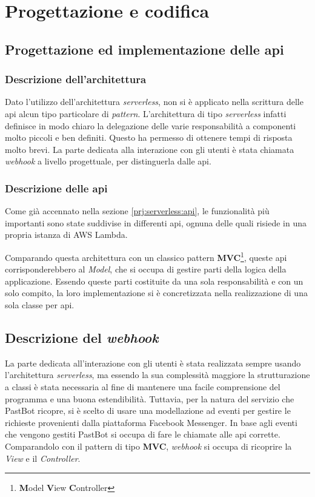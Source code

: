 
\chapter{Progettazione e codifica}

\section{Progettazione ed implementazione delle \gls{api}}

\subsection{Descrizione dell'architettura}

Dato l'utilizzo dell'architettura \textit{serverless}, non si è applicato nella
scrittura delle \gls{api} alcun tipo particolare di \textit{pattern}.
L'architettura di tipo \textit{serverless} infatti definisce in modo chiaro la
delegazione delle varie responsabilità a componenti molto piccoli e ben
definiti. Questo ha permesso di ottenere tempi di risposta molto brevi.
La parte dedicata alla interazione con gli utenti è stata chiamata
\textit{webhook} a livello progettuale, per distinguerla dalle \gls{api}.

\subsection{Descrizione delle \gls{api}}
Come già accennato nella sezione \ref{prj:serverless:api}, le funzionalità più
importanti sono state suddivise in differenti \gls{api}, ognuna delle quali
risiede in una propria istanza di AWS Lambda.

Comparando questa architettura con un classico pattern
\textbf{MVC}\footnote{\textbf{M}odel \textbf{V}iew \textbf{C}ontroller}, queste
\gls{api} corrisponderebbero al \textit{Model}, che si occupa di gestire parti
della logica della applicazione. Essendo queste parti costituite da una sola
responsabilità e con un solo compito, la loro implementazione si è
concretizzata nella realizzazione di una sola classe per \gls{api}.

\section{Descrizione del \textit{webhook}}
La parte dedicata all'interazione con gli utenti è stata realizzata sempre
usando l'architettura \textit{serverless}, ma essendo la sua complessità
maggiore la strutturazione a classi è stata necessaria al fine di mantenere una
facile comprensione del programma e una buona estendibilità. Tuttavia, per la
natura del servizio che PastBot ricopre, si è scelto di usare una modellazione
ad eventi per gestire le richieste provenienti dalla piattaforma Facebook
Messenger. In base agli eventi che vengono gestiti PastBot si occupa di fare le
chiamate alle \gls{api} corrette. Comparandolo con il pattern di tipo
\textbf{MVC}, \textit{webhook} si occupa di ricoprire la \textit{View} e il
\textit{Controller}.

